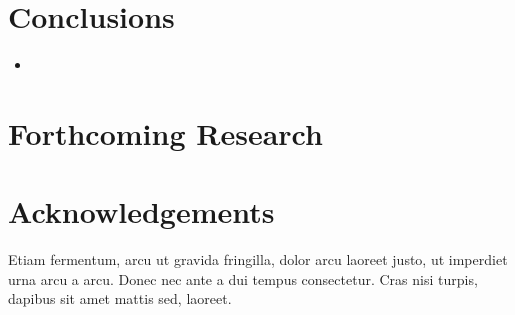 \documentclass[a0,portrait]{a0poster}
\begin{document}
\begin{multicols}{2}


\color{DarkBlue}

\section*{Conclusions}

\begin{itemize}
	\item 
\end{itemize}



\section*{Forthcoming Research}





\section*{Acknowledgements}

Etiam fermentum, arcu ut gravida fringilla, dolor arcu laoreet justo, ut imperdiet urna arcu a arcu. Donec nec ante a dui tempus consectetur. Cras nisi turpis, dapibus sit amet mattis sed, laoreet.


\printbibliography[title={References}]

\end{multicols}
\end{document}
